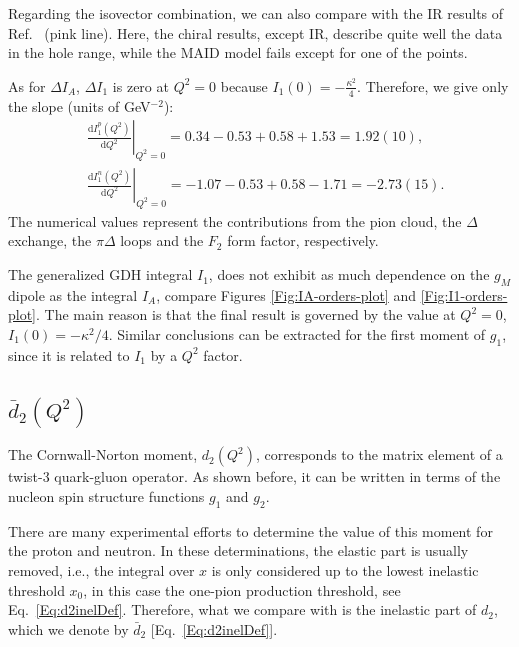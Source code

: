 \documentclass[twocolumn,prc,showpacs,nofootinbib,preprintnumbers,amsmath,amssymb,superscriptaddress]{revtex4-1}
\def\dd{\mathrm{d}}
\begin{document}
Regarding the isovector combination, we can also compare with the IR results of Ref.~\cite{Bernard:2002pw} (pink line). 
Here, the chiral results, except IR, describe quite well the data in the hole range, while the MAID model fails except for one of the points.


As for $\Delta I_A$, $\Delta I_1$ is zero at $Q^2=0$ because $I_1 (0) = - \frac{\kappa^2}{4}$. Therefore, we give only the slope (units of GeV$^{-2}$):
\begin{align}
&\left.\frac{\dd I_1^p (Q^2)}{\dd Q^2}\right|_{Q^2=0}= 0.34 - 0.53 + 0.58 +1.53 =1.92(10) ,\\
&\left.\frac{\dd I_1^n (Q^2)}{\dd Q^2}\right|_{Q^2=0}= -1.07 - 0.53 + 0.58 -1.71=-2.73(15) .
\end{align}
The numerical values represent the contributions from the pion cloud, the $\Delta$ exchange, the $\pi \Delta$ loops and the $F_2$ form factor, respectively.



The generalized GDH integral $I_1$, does not exhibit as much dependence on the $g_M$ dipole as the integral  $I_A$, compare Figures \ref{Fig:IA-orders-plot} and \ref{Fig:I1-orders-plot}. 
The main reason is that the final result is governed by the value at $Q^2=0$, $I_1(0)=-\kappa^2/4$. 
Similar conclusions can be extracted for the first moment of $g_1$, since it is related to $I_1$ by a $Q^2$ factor.


\subsection{$\bar{d}_2(Q^2)$}

The Cornwall-Norton moment, $d_2(Q^2)$, corresponds to the matrix element of a twist-3 quark-gluon operator. 
As shown before, it can be written in terms of the nucleon spin structure functions $g_1$ and $g_2$.
%


There are many experimental efforts to determine the value of this moment for the proton and neutron.
In these determinations, the elastic part is usually removed, i.e., the integral over $x$ is only considered up to the lowest inelastic threshold $x_0$, in this case the one-pion production threshold, see Eq.~\eqref{Eq:d2inelDef}.
Therefore, what we compare with is the inelastic part of $d_2$, which we denote by  $\bar{d}_2$ [Eq.~\eqref{Eq:d2inelDef}].
\end{document}
